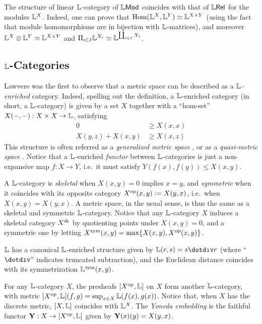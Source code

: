 \begin{remark}
The structure of linear $\mathbb{L}$-category of $\mathbb{L}\mathsf{Mod}$ coincides with that of $\mathbb{L} \mathsf{Rel}$ for the modules $\mathbb{L}^{X}$. Indeed, one can prove that $\mathrm{Hom}(\mathbb{L}^{X},\mathbb{L}^{Y})\simeq \mathbb{L}^{X\times Y} $ (using the fact that module homomorphisms are in bijection with $\mathbb{L}$-matrices), and 
moreover $\mathbb{L}^{X}\otimes \mathbb{L}^{Y}\simeq \mathbb{L}^{X\times Y} $ and 
$\Pi_{i\in I}\mathbb{L}^{X_{i}}\simeq \mathbb{L}^{\coprod_{i\in I}X_{i}}$.
\end{remark}



\subsection{$\mathbb{L}$-Categories}

Lawvere was the first to observe that a metric space can be described as a \emph{$\mathbb{L}$-enriched} category. Indeed, spelling out the definition, a $\mathbb{L}$-enriched category (in short, a $\mathbb{L}$-category) is given by a set $X$ together with a ``hom-set'' $X(-,-):X\times X\to \mathbb{L}$, satisfying 
\begin{align}
0  & \geq X(x,x) \tag{$\Lawv$-cat 1}\\
X(y,z)+X(x,y)&\geq  X(x,z) \tag{$\Lawv$-cat 2}
\end{align}
This structure is often referred as a \emph{generalized metric space} \cite{}, or as a \emph{quasi-metric space} \cite{}. 
Notice that a $\mathbb{L}$-enriched \emph{functor} between $\mathbb{L}$-categories is just a non-expansive map $f:X\to Y$, i.e.~it must satisfy $Y(f(x),f(y))\leq X(x,y)$.

A $\mathbb{L}$-category is \emph{skeletal} \cite{} when 
$X(x,y)=0$ implies $x=y$, and 
 \emph{symmetric} when it coincides with its opposite category $X^{\mathrm{op}}(x,y):=X(y,x)$, i.e.~when $X(x,y)=X(y,x)$. 
 A metric space, in the usual sense, is thus the same as a skeletal and symmetric $\mathbb{L}$-category.
  Notice that any $\mathbb{L}$-category $X$ induces a skeletal category $X^{\mathrm{sk}}$ by quotienting points under $X(x,y)=0$, and a symmetric one by letting $X^{\mathrm{sym}}(x,y)=\max\{X(x,y),X^{\mathrm{op}}(x,y)\}$.
 
 $\mathbb{L}$ has a canonical $\mathbb{L}$-enriched structure given by 
 $\Lawv(r,s)=s \menus r$ (where ``$\dotdiv$'' indicates truncated subtraction), and the Euclidean distance coincides with its symmetrization $\mathbb{L}^{\mathrm{sym}}(x,y)$.
 
 
 
 
 

For any $\mathbb{L}$-category $X$, the presheafs $[X^{\mathrm{op}},\mathbb{L}]$ on $X$ form another $\mathbb{L}$-category, with metric $[X^{\mathrm{op}},\mathbb{L}](f,g)= \sup_{x\in X}\mathbb{L}(f(x),g(x))$.
Notice that, when $X$ has the discrete metric, $[X,\mathbb{L}]$ coincides with $\mathbb{L}^{X}$.
The \emph{Yoneda embedding} is the faithful functor $\mathbf{Y}: X\to [X^{\mathrm{op}},\mathbb{L}]$ given by $\mathbf{Y}(x)(y)=X(y,x)$.



